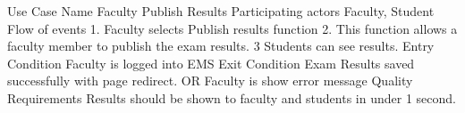 Use Case Name	Faculty Publish Results
Participating actors	 Faculty, Student
Flow of events	
1. Faculty selects Publish results function
2. This function allows a faculty member to publish the exam results.
3 Students can see results.
Entry Condition	Faculty is logged into EMS
Exit Condition	Exam Results saved successfully with page redirect.
OR
Faculty is show error message 
Quality Requirements	Results should be shown to faculty and students in under 1 second.
	
